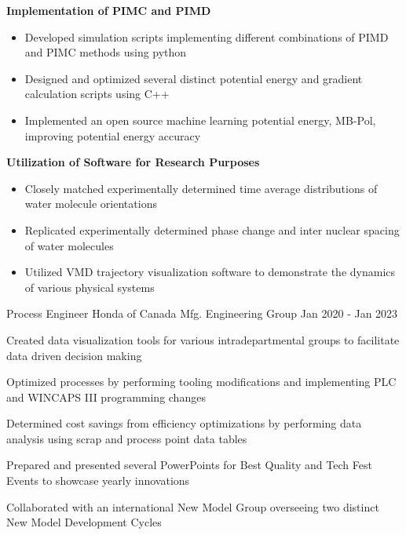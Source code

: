 \begin{cventries}
{\begin{cvitems}
        \item \textbf{Implementation of PIMC and PIMD}
        \begin{itemize}
            \item Developed simulation scripts implementing different combinations of PIMD and PIMC methods using python
            \item Designed and optimized several distinct potential energy and gradient calculation scripts using C++ 
            \item Implemented an open source machine learning potential energy, MB-Pol, improving potential energy accuracy
        \end{itemize}
        \vspace{0.05cm}
        \item \textbf{Utilization of Software for Research Purposes}
        \begin{itemize}
            \item Closely matched experimentally determined time average distributions of water molecule orientations
            \item Replicated experimentally determined phase change and inter nuclear spacing of water molecules
            \item Utilized VMD trajectory visualization software to demonstrate the dynamics of various physical systems
        \vspace{0.05cm}
        \end{itemize}
      \end{cvitems}
    }
  \cventry
    {Process Engineer} %
    {Honda of Canada Mfg.} %
    {Engineering Group} %
    {Jan 2020 - Jan 2023} %
    {
      \begin{cvitems} %
        \item Created data visualization tools for various intradepartmental groups to facilitate data driven decision making
        \item Optimized processes by performing tooling modifications and implementing PLC and WINCAPS III programming changes
        \item Determined cost savings from efficiency optimizations by performing data analysis using scrap and process point data tables
        \item Prepared and presented several PowerPoints for Best Quality and Tech Fest Events to showcase yearly innovations
        \item Collaborated with an international New Model Group overseeing two distinct New Model Development Cycles

\end{cvitems}}
\end{cventries}
